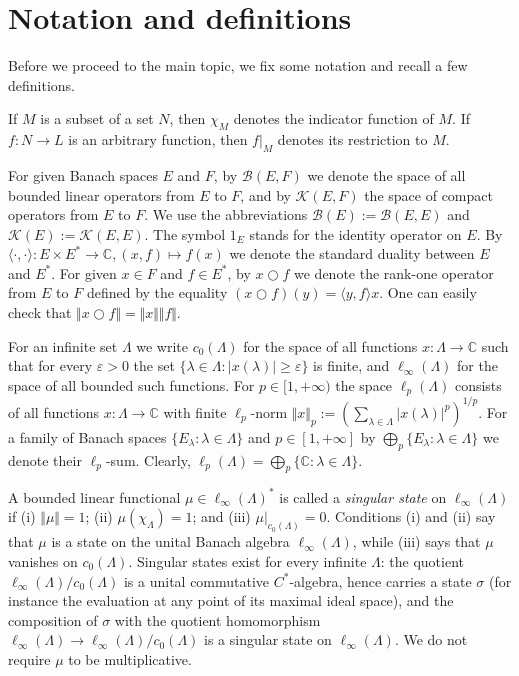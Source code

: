\documentclass[12pt]{article}
\begin{document}

\section{Notation and definitions}\label{SectionNotationAndDefinitions} 
Before we proceed to the main topic, we fix some notation and recall a few 
definitions.

If $M$ is a subset of a set $N$, then $\chi_M$ denotes the indicator function
of $M$. If $f:N\to L$ is an arbitrary function, then $f|_M$ denotes its
restriction to $M$.

For given Banach spaces $E$ and $F$, by $\mathcal{B}(E, F)$ we denote the 
space of all bounded linear operators from $E$ to $F$, and 
by $\mathcal{K}(E, F)$ the space of compact operators 
from $E$ to $F$. We use the 
abbreviations $\mathcal{B}(E):=\mathcal{B}(E, E)$ 
and $\mathcal{K}(E):=\mathcal{K}(E, E)$. The symbol $1_E$ stands for the 
identity operator on $E$. By
$
    \langle\cdot,\cdot\rangle: E\times E^*\to\mathbb{C}, (x,f)\mapsto f(x)
$
we denote the standard duality between $E$ and $E^*$. For given $x\in F$ 
and $f\in E^*$, by $x\bigcirc f$ we denote the rank-one operator from $E$ 
to $F$ defined by the equality $(x\bigcirc f)(y)=\langle y, f\rangle x$. One
can easily check that $\Vert x\bigcirc f\Vert=\Vert x\Vert\Vert f\Vert$.

For an infinite set $\Lambda$ we write $c_0(\Lambda)$ for the space of all 
functions $x:\Lambda\to\mathbb{C}$ such that for every $\varepsilon>0$ the 
set $\{\lambda\in\Lambda:|x(\lambda)|\geq\varepsilon\}$ is finite, and 
$\ell_\infty(\Lambda)$ for the space of all bounded such functions. For 
$p\in[1,+\infty)$ the space $\ell_p(\Lambda)$ consists of all 
functions $x:\Lambda\to\mathbb{C}$ with finite $\ell_p$-norm
$\Vert x\Vert_p:=(\sum_{\lambda\in\Lambda}|x(\lambda)|^p)^{1/p}$. For a 
family of Banach spaces $\{E_\lambda:\lambda\in\Lambda\}$ and $p\in[1,+\infty]$
by $\bigoplus_p\{E_\lambda:\lambda\in\Lambda\}$ we denote 
their $\ell_p$-sum. Clearly, 
$\ell_p(\Lambda)=\bigoplus_p\{\mathbb{C}:\lambda\in\Lambda\}$.

A bounded linear functional $\mu\in\ell_\infty(\Lambda)^*$ is called 
a \textit{singular state} on $\ell_\infty(\Lambda)$ if (i) $\Vert\mu\Vert=1$; 
(ii) $\mu(\chi_\Lambda)=1$; and (iii) $\mu|_{c_0(\Lambda)}=0$. Conditions (i) 
and (ii) say that $\mu$ is a state on the unital Banach algebra 
$\ell_\infty(\Lambda)$, while (iii) says that $\mu$ vanishes on $c_0(\Lambda)$. 
Singular states exist for every infinite $\Lambda$: the quotient 
$\ell_\infty(\Lambda)/c_0(\Lambda)$ is a unital commutative $C^*$-algebra, hence 
carries a state $\sigma$ (for instance the evaluation at any point of its 
maximal ideal space), and the composition of $\sigma$ with the quotient 
homomorphism $\ell_\infty(\Lambda)\to\ell_\infty(\Lambda)/c_0(\Lambda)$ is a 
singular state on $\ell_\infty(\Lambda)$. We do not require $\mu$ to be 
multiplicative.
\end{document}
